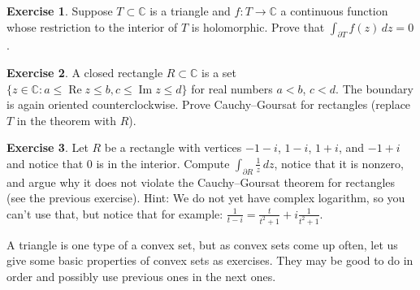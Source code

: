 \documentclass[12pt,openany]{book}
\renewcommand{\Re}{\operatorname{Re}}
\renewcommand{\Im}{\operatorname{Im}}
\newcommand{\C}{{\mathbb{C}}}
\theoremstyle{plain}
\theoremstyle{remark}
\theoremstyle{definition}
\newenvironment{exbox}{%
    \def\FrameCommand{\vrule width 1pt \relax\hspace{10pt}}%
    \MakeFramed{\advance\hsize-\width\FrameRestore}%
}{%
    \endMakeFramed
}
\theoremstyle{exercise}
\newtheorem{exercise}{Exercise}[section]
\theoremstyle{example}
\begin{document}
\begin{exbox}
\begin{exercise}
Suppose $T \subset \C$ is a triangle and $f \colon T \to \C$ a
continuous function whose restriction to the interior of $T$ is holomorphic.
Prove that $\int_{\partial T} f(z) \, dz = 0$.
\end{exercise}

\begin{exercise}
A closed rectangle $R \subset \C$ is a set
$\bigl\{ z \in \C : a \leq \Re z \leq b , c \leq \Im z \leq d \bigr\}$
for real numbers $a < b$, $c < d$.  The boundary
is again oriented counterclockwise.  Prove Cauchy--Goursat for rectangles
(replace $T$ in the theorem with $R$).
\end{exercise}

\begin{exercise}
Let $R$ be a rectangle with vertices
$-1-i$, $1-i$, $1+i$, and $-1+i$ and notice that $0$ is in the interior.
Compute $\int_{\partial R} \frac{1}{z} \, dz$,
notice that it is nonzero, and argue why it does not violate the
Cauchy--Goursat theorem for rectangles (see the previous exercise).
Hint: We do not yet have complex logarithm, so you can't use that,
but notice that for example:
$\frac{1}{t-i} = \frac{t}{t^2+1} + i \frac{1}{t^2+1}$.
\end{exercise}
\end{exbox}

A triangle is one type of a convex set, but as convex sets come up
often, let us give some basic properties of convex sets as exercises.
They may be good to do in order and possibly use previous ones in the next
ones.
\end{document}
